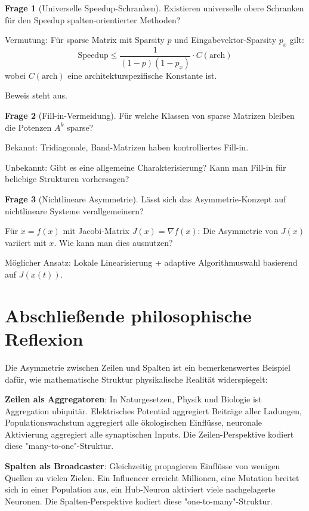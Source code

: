 ﻿\documentclass[a4paper,12pt]{report}
\theoremstyle{definition}
\newtheorem{frage}{Frage}
\begin{document}
	\begin{frage}[Universelle Speedup-Schranken]
		Existieren universelle obere Schranken für den Speedup spalten-orientierter Methoden?
		
		Vermutung: Für sparse Matrix mit Sparsity $p$ und Eingabevektor-Sparsity $p_x$ gilt:
		\[
		\text{Speedup} \leq \frac{1}{(1-p)(1-p_x)} \cdot C(\text{arch})
		\]
		wobei $C(\text{arch})$ eine architekturspezifische Konstante ist.
		
		Beweis steht aus.
	\end{frage}
	
	\begin{frage}[Fill-in-Vermeidung]
		Für welche Klassen von sparse Matrizen bleiben die Potenzen $A^k$ sparse?
		
		Bekannt: Tridiagonale, Band-Matrizen haben kontrolliertes Fill-in.
		
		Unbekannt: Gibt es eine allgemeine Charakterisierung? Kann man Fill-in für beliebige Strukturen vorhersagen?
	\end{frage}
	
	\begin{frage}[Nichtlineare Asymmetrie]
		Lässt sich das Asymmetrie-Konzept auf nichtlineare Systeme verallgemeinern?
		
		Für $\dot{x} = f(x)$ mit Jacobi-Matrix $J(x) = \nabla f(x)$: Die Asymmetrie von $J(x)$ variiert mit $x$. Wie kann man dies ausnutzen?
		
		Möglicher Ansatz: Lokale Linearisierung + adaptive Algorithmuswahl basierend auf $J(x(t))$.
	\end{frage}
	
	\section{Abschließende philosophische Reflexion}
	
	Die Asymmetrie zwischen Zeilen und Spalten ist ein bemerkenswertes Beispiel dafür, wie mathematische Struktur physikalische Realität widerspiegelt:
	
	\textbf{Zeilen als Aggregatoren}: In Naturgesetzen, Physik und Biologie ist Aggregation ubiquitär. Elektrisches Potential aggregiert Beiträge aller Ladungen, Populationswachstum aggregiert alle ökologischen Einflüsse, neuronale Aktivierung aggregiert alle synaptischen Inputs. Die Zeilen-Perspektive kodiert diese "many-to-one"-Struktur.
	
	\textbf{Spalten als Broadcaster}: Gleichzeitig propagieren Einflüsse von wenigen Quellen zu vielen Zielen. Ein Influencer erreicht Millionen, eine Mutation breitet sich in einer Population aus, ein Hub-Neuron aktiviert viele nachgelagerte Neuronen. Die Spalten-Perspektive kodiert diese "one-to-many"-Struktur.
	
\end{document}
